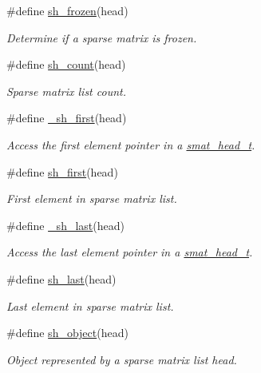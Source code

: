 \begin{CompactItemize}
\#define \hyperlink{group__dbprim__smat_ga46}{sh\_\-frozen}(head)
\begin{CompactList}\small\item\em Determine if a sparse matrix is frozen. \item\end{CompactList}\item 
\#define \hyperlink{group__dbprim__smat_ga47}{sh\_\-count}(head)
\begin{CompactList}\small\item\em Sparse matrix list count. \item\end{CompactList}\item 
\#define \hyperlink{group__dbprim__smat_ga48}{\_\-sh\_\-first}(head)
\begin{CompactList}\small\item\em Access the first element pointer in a \hyperlink{group__dbprim__smat_ga1}{smat\_\-head\_\-t}. \item\end{CompactList}\item 
\#define \hyperlink{group__dbprim__smat_ga49}{sh\_\-first}(head)
\begin{CompactList}\small\item\em First element in sparse matrix list. \item\end{CompactList}\item 
\#define \hyperlink{group__dbprim__smat_ga50}{\_\-sh\_\-last}(head)
\begin{CompactList}\small\item\em Access the last element pointer in a \hyperlink{group__dbprim__smat_ga1}{smat\_\-head\_\-t}. \item\end{CompactList}\item 
\#define \hyperlink{group__dbprim__smat_ga51}{sh\_\-last}(head)
\begin{CompactList}\small\item\em Last element in sparse matrix list. \item\end{CompactList}\item 
\#define \hyperlink{group__dbprim__smat_ga52}{sh\_\-object}(head)
\begin{CompactList}\small\item\em Object represented by a sparse matrix list head. \item\end{CompactList}\item 

\end{CompactItemize}
